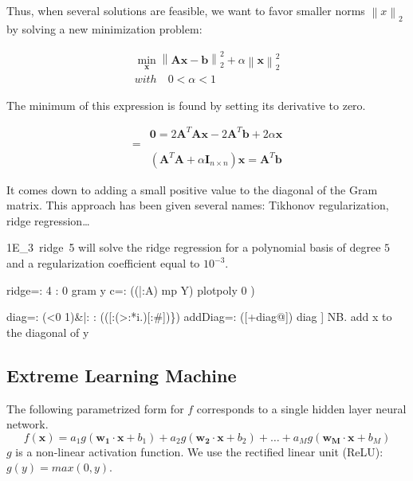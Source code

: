 \documentclass[10pt]{article}%
\renewcommand{\vec}[1]{\boldsymbol{#1}}
\newcommand{\norm}[1]{\left\lVert#1\right\rVert}
\begin{document}
Thus, when several solutions are feasible, we want to favor smaller
norms $\norm{x}_2$ by solving a new minimization problem:

\begin{align*}
\min_{\vec{x}} \norm{\vec{A}\vec{x}-\vec{b}}^2_2 + \alpha \norm{\vec{x}}^2_2 \\
with \quad 0 < \alpha < 1
\end{align*}

The minimum of this expression is found by setting its derivative to zero.

\begin{align*}
 & \vec{0} = 2\vec{A}^T\vec{A}\vec{x} - 2\vec{A}^T\vec{b} + 2\alpha\vec{x} \\
=& \\
 & \left( \vec{A}^T\vec{A} + \alpha \vec{I}_{n\times n} \right) \vec{x} = \vec{A}^T \vec{b}
\end{align*}

It comes down to adding a small positive value to the diagonal of the
Gram matrix. This approach has been given several names: Tikhonov regularization,
ridge regression\dots

{\Tt{}1E{\_}3\ ridge\ 5\nwendquote} will solve the ridge regression for a polynomial basis of
degree $5$ and a regularization coefficient equal to $10^{-3}$.

\nwenddocs{}\endmoddef\nwstartdeflinemarkup{}\nwenddeflinemarkup
ridge=: 4 : 0
  gram y
  c=: ((|:A) mp Y) %
  plotpoly 0
)

\nwendcode{}\plusendmoddef\nwstartdeflinemarkup{}\nwenddeflinemarkup
diag=: (<0 1)&|: : (([:(>:*i.)[:#])\})
addDiag=: ([+diag@]) diag ] NB. add x to the diagonal of y

\nwendcode{}\nwdocspar
\subsection{Extreme Learning Machine}
The following parametrized form for $f$ corresponds to a single hidden layer
neural network.
\[
f(\vec{x}) = a_1 g(\vec{w_1}\cdot\vec{x}+b_1) + a_2 g(\vec{w_2}\cdot\vec{x}+b_2) 
+ \dots + a_M g(\vec{w_M}\cdot\vec{x}+b_M)
\]
$g$ is a non-linear activation function. We use the rectified linear unit (ReLU):
$g(y)=max(0,y)$.
\end{document}
